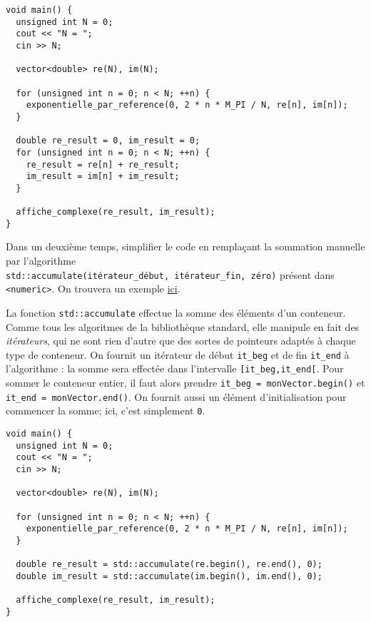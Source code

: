 \documentclass{book}
\newcommand{\inline}[1]{\texttt{#1}}
\begin{document}
\begin{correction}
\begin{verbatim}
void main() {
  unsigned int N = 0;
  cout << "N = ";
  cin >> N;

  vector<double> re(N), im(N);

  for (unsigned int n = 0; n < N; ++n) {
    exponentielle_par_reference(0, 2 * n * M_PI / N, re[n], im[n]);
  }

  double re_result = 0, im_result = 0;
  for (unsigned int n = 0; n < N; ++n) {
    re_result = re[n] + re_result;
    im_result = im[n] + im_result;
  }

  affiche_complexe(re_result, im_result);
}
\end{verbatim}
\end{correction}

\vspace{1em}
Dans un deuxième temps, simplifier le code en remplaçant la sommation manuelle par l'algorithme\\ \inline{std::accumulate(itérateur_début, itérateur_fin, zéro)} présent dans \inline{<numeric>}. On trouvera un exemple \href{https://en.cppreference.com/w/cpp/algorithm/accumulate}{ici}.

\begin{correction}
La fonction \inline{std::accumulate} effectue la somme des éléments d'un conteneur. Comme tous les algoritmes de la bibliothèque standard, elle manipule en fait des \emph{itérateurs}, qui ne sont rien d'autre que des sortes de pointeurs adaptés à chaque type de conteneur. On fournit un itérateur de début \texttt{it\_beg} et de fin \texttt{it\_end} à l'algorithme : la somme sera effectée dans l'intervalle \texttt{[it\_beg,it\_end[}. Pour sommer le conteneur entier, il faut alors prendre \inline{it_beg = monVector.begin()} et \inline{it_end = monVector.end()}. On fournit aussi un élément d'initialisation pour commencer la somme; ici, c'est simplement \inline{0}.

\begin{verbatim}
void main() {
  unsigned int N = 0;
  cout << "N = ";
  cin >> N;

  vector<double> re(N), im(N);

  for (unsigned int n = 0; n < N; ++n) {
    exponentielle_par_reference(0, 2 * n * M_PI / N, re[n], im[n]);
  }

  double re_result = std::accumulate(re.begin(), re.end(), 0);
  double im_result = std::accumulate(im.begin(), im.end(), 0);

  affiche_complexe(re_result, im_result);
}
\end{verbatim}
\end{correction}
\end{document}
